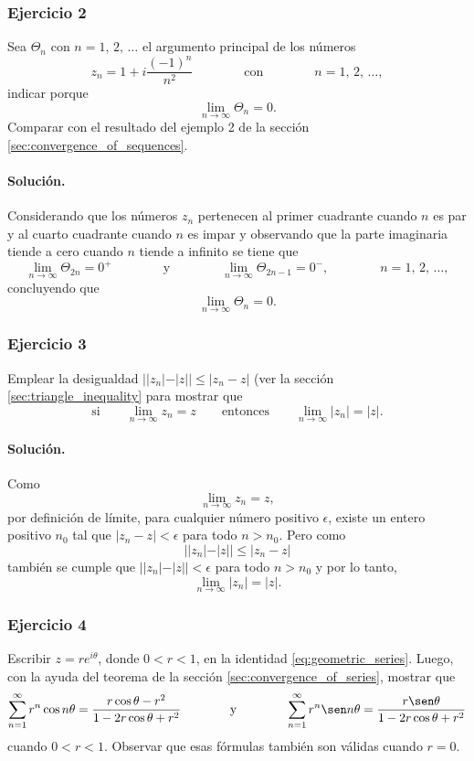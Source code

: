 \documentclass[a4paper]{report}
\begin{document}
\subsubsection{Ejercicio 2}

Sea \(\Theta_n\) con \(n=1,\,2,\,\dots\) el argumento principal de los números 
\[
 z_n=1+i\frac{(-1)^n}{n^2}
 \qquad\qquad\textrm{con}\qquad\qquad
 n=1,\,2,\,\dots,
\]
indicar porque 
\[
 \lim_{n\to\infty}\Theta_n=0.
\]
Comparar con el resultado del ejemplo 2 de la sección \ref{sec:convergence_of_sequences}. 

\paragraph{Solución.} Considerando que los números \(z_n\) pertenecen al primer cuadrante cuando \(n\) es par y al cuarto cuadrante cuando \(n\) es impar y observando que la parte imaginaria tiende a cero cuando \(n\) tiende a infinito  se tiene que 
\[
 \lim_{n\to\infty}\Theta_{2n}=0^+
 \qquad\qquad\textrm{y}\qquad\qquad
 \lim_{n\to\infty}\Theta_{2n-1}=0^-,
 \qquad\qquad
 n=1,\,2,\,\dots,
\]
concluyendo que 
\[
 \lim_{n\to\infty}\Theta_n=0.
\]

\subsubsection{Ejercicio 3}

Emplear la desigualdad \(||z_n|-|z||\leq|z_n-z|\) (ver la sección \ref{sec:triangle_inequality} para mostrar que 
\[
 \textrm{si}\qquad
 \lim_{n\to\infty}z_n=z
 \qquad\textrm{entonces}\qquad
 \lim_{n\to\infty}|z_n|=|z|.
\]

\paragraph{Solución.} Como 
\[
 \lim_{n\to\infty}z_n=z,
\]
por definición de límite, para cualquier número positivo \(\epsilon\), existe un entero positivo \(n_0\) tal que \(|z_n-z|<\epsilon\) para todo \(n>n_0\). Pero como
\[
 ||z_n|-|z||\leq|z_n-z|
\]
también se cumple que \(||z_n|-|z||<\epsilon\) para todo \(n>n_0\) y por lo tanto,
\[
 \lim_{n\to\infty}|z_n|=|z|.
\]

\subsubsection{Ejercicio 4}

Escribir \(z=re^{i\theta}\), donde \(0<r<1\), en la identidad \ref{eq:geometric_series}. Luego, con la ayuda del teorema de la sección \ref{sec:convergence_of_series}, mostrar que 
\[
 \sum_{n=1}^\infty r^n\cos n\theta=\frac{r\cos\theta-r^2}{1-2r\cos\theta+r^2}
 \qquad\qquad\textrm{y}\qquad\qquad
 \sum_{n=1}^\infty r^n\sen n\theta=\frac{r\sen \theta}{1-2r\cos\theta+r^2}
\]
cuando \(0<r<1\). Observar que esas fórmulas también son válidas cuando \(r=0\).
\end{document}
